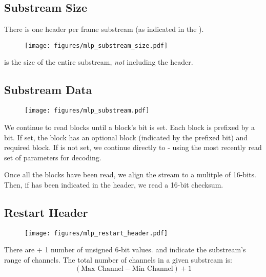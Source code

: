 \subsection{Substream Size}
There is one  header per frame substream
(as indicated in the ).
\begin{figure}[h]
\texttt{[image: figures/mlp\_substream\_size.pdf]}
\end{figure}
\par
\noindent
{} is the size of the entire substream,
\textit{not} including the header.

\clearpage

\subsection{Substream Data}

\begin{figure}[h]
\texttt{[image: figures/mlp\_substream.pdf]}
\end{figure}
We continue to read blocks until a block's  bit is set.
Each block is prefixed by a  bit.
If set, the block has an optional  block
(indicated by the prefixed  bit)
and required  block.
If  is not set, we continue directly to
 - using the most recently read set of parameters for
decoding.

Once all the blocks have been read, we align the stream to a
mulitple of 16-bits.
Then, if  has been indicated in the
 header, we read a 16-bit checksum.

\subsection{Restart Header}
\begin{figure}[h]
\texttt{[image: figures/mlp\_restart\_header.pdf]}
\end{figure}
\par
\noindent
There are  + 1 number of
unsigned 6-bit  values.
 and  indicate the substream's
range of channels.
The total number of channels in a given substream is:
\begin{equation*}
(\text{Max Channel} - \text{Min Channel}) + 1
\end{equation*}

